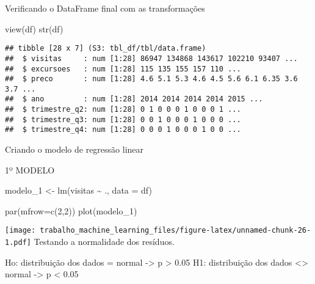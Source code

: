 \documentclass[
]{article}
\newenvironment{Shaded}{\begin{snugshade}}{\end{snugshade}}
\newcommand{\AttributeTok}[1]{\textcolor[rgb]{0.77,0.63,0.00}{#1}}
\newcommand{\DecValTok}[1]{\textcolor[rgb]{0.00,0.00,0.81}{#1}}
\newcommand{\FunctionTok}[1]{\textcolor[rgb]{0.00,0.00,0.00}{#1}}
\newcommand{\NormalTok}[1]{#1}
\newcommand{\OtherTok}[1]{\textcolor[rgb]{0.56,0.35,0.01}{#1}}
\newcommand{\SpecialCharTok}[1]{\textcolor[rgb]{0.00,0.00,0.00}{#1}}
\begin{document}
Verificando o DataFrame final com as transformações

\begin{Shaded}
\begin{Highlighting}[]
\FunctionTok{view}\NormalTok{(df)}
\FunctionTok{str}\NormalTok{(df)}
\end{Highlighting}
\end{Shaded}

\begin{verbatim}
## tibble [28 x 7] (S3: tbl_df/tbl/data.frame)
##  $ visitas     : num [1:28] 86947 134868 143617 102210 93407 ...
##  $ excursoes   : num [1:28] 115 135 155 157 110 ...
##  $ preco       : num [1:28] 4.6 5.1 5.3 4.6 4.5 5.6 6.1 6.35 3.6 3.7 ...
##  $ ano         : num [1:28] 2014 2014 2014 2014 2015 ...
##  $ trimestre_q2: num [1:28] 0 1 0 0 0 1 0 0 0 1 ...
##  $ trimestre_q3: num [1:28] 0 0 1 0 0 0 1 0 0 0 ...
##  $ trimestre_q4: num [1:28] 0 0 0 1 0 0 0 1 0 0 ...
\end{verbatim}

Criando o modelo de regressão linear

1º MODELO

\begin{Shaded}
\begin{Highlighting}[]
\NormalTok{modelo\_1 }\OtherTok{\textless{}{-}} \FunctionTok{lm}\NormalTok{(visitas }\SpecialCharTok{\textasciitilde{}}\NormalTok{ ., }\AttributeTok{data =}\NormalTok{ df)}
\end{Highlighting}
\end{Shaded}

\begin{Shaded}
\begin{Highlighting}[]
\FunctionTok{par}\NormalTok{(}\AttributeTok{mfrow=}\FunctionTok{c}\NormalTok{(}\DecValTok{2}\NormalTok{,}\DecValTok{2}\NormalTok{))}
\FunctionTok{plot}\NormalTok{(modelo\_1)}
\end{Highlighting}
\end{Shaded}

\texttt{[image: trabalho\_machine\_learning\_files/figure-latex/unnamed-chunk-26-1.pdf]}
Testando a normalidade dos resíduos.

Ho: distribuição dos dados = normal -\textgreater{} p \textgreater{}
0.05 H1: distribuição dos dados \textless\textgreater{} normal
-\textgreater{} p \textless{} 0.05

\begin{Shaded}
\end{Shaded}
\end{document}
